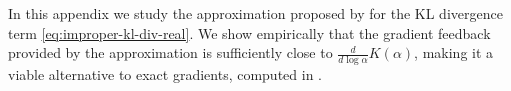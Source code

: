 \documentclass[a4paper,10pt,twocolumn]{article}
\begin{document}
In this appendix we study the approximation proposed by \citet{molchanov_variational_2017}
for the KL divergence term \eqref{eq:improper-kl-div-real}. We show empirically that
the gradient feedback provided by the approximation is sufficiently close to $
  \tfrac{d}{d\log \alpha} K(\alpha)
$, making it a viable alternative to exact gradients, computed in \citet{hron_variational_2018}.

\end{document}
